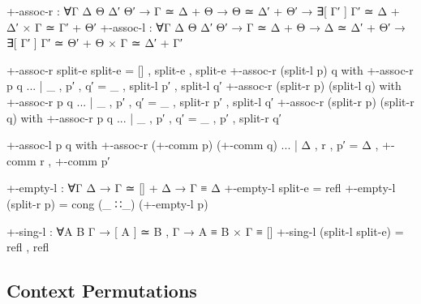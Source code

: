 \begin{code}
+-assoc-r  : ∀{Γ Δ Θ Δ′ Θ′} → Γ ≃ Δ + Θ → Θ ≃ Δ′ + Θ′ →
             ∃[ Γ′ ] Γ′ ≃ Δ + Δ′ × Γ ≃ Γ′ + Θ′
+-assoc-l  : ∀{Γ Δ Θ Δ′ Θ′} → Γ ≃ Δ + Θ → Δ ≃ Δ′ + Θ′ →
             ∃[ Γ′ ] Γ′ ≃ Θ′ + Θ × Γ ≃ Δ′ + Γ′
\end{code}
\begin{code}[hide]
+-assoc-r split-e split-e = [] , split-e , split-e
+-assoc-r (split-l p) q with +-assoc-r p q
... | _ , p′ , q′ = _ , split-l p′ , split-l q′
+-assoc-r (split-r p) (split-l q) with +-assoc-r p q
... | _ , p′ , q′ = _ , split-r p′ , split-l q′
+-assoc-r (split-r p) (split-r q) with +-assoc-r p q
... | _ , p′ , q′ = _ , p′ , split-r q′

+-assoc-l p q with +-assoc-r (+-comm p) (+-comm q)
... | Δ , r , p′ = Δ , +-comm r , +-comm p′

+-empty-l : ∀{Γ Δ} → Γ ≃ [] + Δ → Γ ≡ Δ
+-empty-l split-e = refl
+-empty-l (split-r p) = cong (_ ∷_) (+-empty-l p)

+-sing-l : ∀{A B Γ} → [ A ] ≃ B , Γ → A ≡ B × Γ ≡ []
+-sing-l (split-l split-e) = refl , refl
\end{code}

\subsection{Context Permutations}
\label{sec:permutation-agda}

